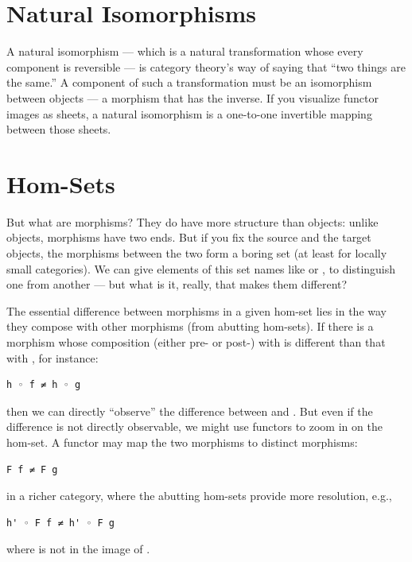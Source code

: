 \section{Natural Isomorphisms}\label{natural-isomorphisms}

A natural isomorphism --- which is a natural transformation whose every
component is reversible --- is category theory's way of saying that
``two things are the same.'' A component of such a transformation must
be an isomorphism between objects --- a morphism that has the inverse.
If you visualize functor images as sheets, a natural isomorphism is a
one-to-one invertible mapping between those sheets.

\section{Hom-Sets}\label{hom-sets}

But what are morphisms? They do have more structure than objects: unlike
objects, morphisms have two ends. But if you fix the source and the
target objects, the morphisms between the two form a boring set (at
least for locally small categories). We can give elements of this set
names like  or , to distinguish one from another ---
but what is it, really, that makes them different?

The essential difference between morphisms in a given hom-set lies in
the way they compose with other morphisms (from abutting hom-sets). If
there is a morphism  whose composition (either pre- or post-)
with  is different than that with , for instance:

\begin{Verbatim}[commandchars=\\\{\}]
h ◦ f ≠ h ◦ g
\end{Verbatim}
then we can directly ``observe'' the difference between  and
. But even if the difference is not directly observable, we
might use functors to zoom in on the hom-set. A functor  may
map the two morphisms to distinct morphisms:

\begin{Verbatim}[commandchars=\\\{\}]
F f ≠ F g
\end{Verbatim}
in a richer category, where the abutting hom-sets provide more
resolution, e.g.,

\begin{Verbatim}[commandchars=\\\{\}]
h' ◦ F f ≠ h' ◦ F g
\end{Verbatim}
where  is not in the image of .

